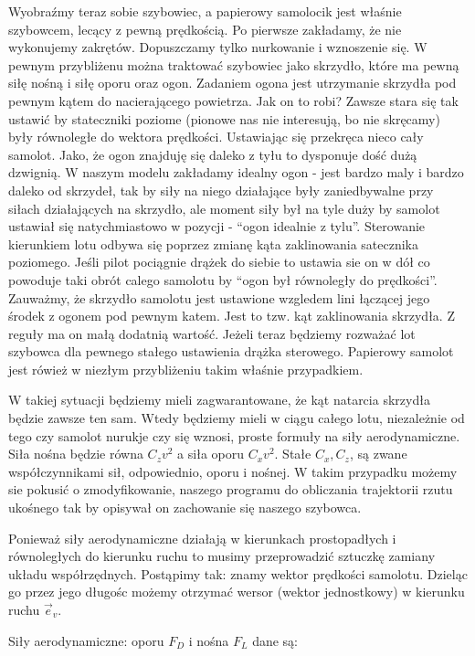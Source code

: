 \documentclass[10pt,twocolumn]{article}
\begin{document}
Wyobraźmy teraz sobie szybowiec, a papierowy samolocik jest właśnie
szybowcem, lecący z pewną prędkością. Po pierwsze zakładamy,
że nie wykonujemy zakrętów. Dopuszczamy tylko nurkowanie i wznoszenie
się. W pewnym przybliżenu można traktować szybowiec jako skrzydło,
które ma pewną siłę nośną i siłę oporu oraz ogon. Zadaniem ogona jest
utrzymanie skrzydła pod pewnym kątem do nacierającego powietrza. Jak
on to robi? Zawsze stara się tak ustawić by stateczniki poziome
(pionowe nas nie interesują, bo nie skręcamy) były równoległe do
wektora prędkości. Ustawiając się przekręca nieco cały samolot. Jako,
że ogon znajduję się daleko z tyłu to dysponuje dość dużą dzwignią. W
naszym modelu zakładamy idealny ogon - jest bardzo maly i bardzo
daleko od skrzydeł, tak by siły na niego działające były zaniedbywalne
przy siłach działających na skrzydło, ale moment siły był na tyle duży
by samolot ustawiał się natychmiastowo w pozycji - ``ogon idealnie z
tylu''. Sterowanie kierunkiem lotu odbywa się poprzez zmianę kąta
zaklinowania satecznika poziomego. Jeśli pilot pociągnie drążek do
siebie to ustawia sie on w dół co powoduje taki obrót calego samolotu
by ``ogon był równoległy do prędkości''. Zauważmy, że skrzydło
samolotu jest ustawione wzgledem lini łączącej jego środek z ogonem
pod pewnym katem. Jest to tzw. kąt zaklinowania skrzydła. Z reguły ma
on małą dodatnią wartość. Jeżeli teraz będziemy rozważać lot szybowca
dla pewnego stałego ustawienia drążka sterowego. Papierowy samolot
jest rówież w niezłym przybliżeniu takim właśnie przypadkiem.

W takiej sytuacji będziemy mieli zagwarantowane, że kąt natarcia
skrzydła będzie zawsze ten sam. Wtedy będziemy mieli w ciągu całego
lotu, niezależnie od tego czy samolot nurukje czy się wznosi, proste
formuły na siły aerodynamiczne. Siła nośna będzie równa $C_z v^2$ a
siła oporu $C_x v^2$. Stałe $C_x,C_z$, są zwane współczynnikami sił,
odpowiednio, oporu i nośnej. W takim przypadku możemy sie pokusić o
zmodyfikowanie, naszego programu do obliczania trajektorii rzutu
ukośnego tak by opisywał on zachowanie się naszego szybowca.

Ponieważ siły aerodynamiczne działają w kierunkach prostopadłych i
równoległych do kierunku ruchu to musimy przeprowadzić sztuczkę
zamiany układu współrzędnych. Postąpimy tak: znamy wektor prędkości
samolotu. Dzieląc go przez jego długośc możemy otrzymać wersor (wektor
jednostkowy) w kierunku ruchu $\vec e_v$. 

Siły aerodynamiczne: oporu $F_D$ i nośna $F_L$ dane są:
\end{document}
